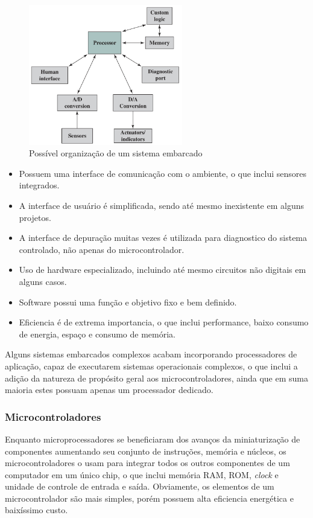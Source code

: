 \documentclass{article}
\begin{document}
\begin{figure}[h]
  \centering
  \includegraphics[width=0.6\textwidth]{embarcado.png}
  \caption{Possível organização de um sistema embarcado}
\end{figure}

\begin{itemize}
\item Possuem uma interface de comunicação com o ambiente,
  o que inclui sensores integrados.

\item A interface de usuário é simplificada, sendo até mesmo
  inexistente em alguns projetos.

\item A interface de depuração muitas vezes é utilizada para
  diagnostico do sistema controlado, não apenas do microcontrolador.

\item Uso de hardware especializado, incluindo até mesmo circuitos
  não digitais em alguns casos.

\item Software possui uma função e objetivo fixo e bem definido.

\item Eficiencia é de extrema importancia, o que inclui performance,
  baixo consumo de energia, espaço e consumo de memória.
\end{itemize}

Alguns sistemas embarcados complexos acabam incorporando processadores
de aplicação, capaz de executarem sistemas operacionais complexos, o
que inclui a adição da natureza de propósito geral aos
microcontroladores, ainda que em suma maioria estes possuam apenas um
processador dedicado.

\subsubsection{Microcontroladores}
Enquanto microprocessadores se beneficiaram dos avanços da
miniaturização de componentes aumentando seu conjunto de instruções,
memória e núcleos, os microcontroladores o usam para integrar todos os
outros componentes de um computador em um único chip, o que inclui
memória RAM, ROM, \textit{clock} e unidade de controle de entrada e
saída. Obviamente, os elementos de um microcontrolador são mais
simples, porém possuem alta eficiencia energética e baixíssimo custo.
\end{document}

